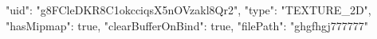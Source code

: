 {
    "uid": "g8FCleDKR8C1okcciqsX5nOVzakl8Qr2",
    "type": "TEXTURE_2D",
    "hasMipmap": true,
    "clearBufferOnBind": true,
    "filePath": "ghgfhgj777777"
}